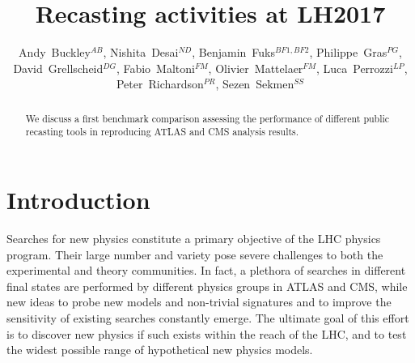 \documentclass[11pt]{cernrep}
\begin{document}
\setlength\parindent{0pt}

\title{Recasting activities at LH2017}

\author{
Andy~Buckley$^{AB}$, 
Nishita~Desai$^{ND}$,
Benjamin~Fuks$^{BF1,BF2}$,
Philippe~Gras$^{PG}$, 
David~Grellscheid$^{DG}$,
Fabio~Maltoni$^{FM}$,
Olivier~Mattelaer$^{FM}$,
Luca~Perrozzi$^{LP}$,
Peter~Richardson$^{PR}$,
Sezen~Sekmen$^{SS}$
}


\maketitle

\begin{abstract}
We discuss a first benchmark comparison assessing the performance of different public recasting tools in reproducing ATLAS and CMS analysis results.
\end{abstract}

\section{Introduction}

Searches for new physics constitute a primary objective of the LHC physics program.
Their large number and variety pose severe challenges to both the experimental and theory communities. 
In fact, a plethora of searches in different final states are performed by different physics groups in ATLAS and CMS, 
while new ideas to probe new models and non-trivial signatures and to improve the sensitivity of existing searches constantly emerge.
The ultimate goal of this effort is to discover new physics if such
exists within the reach of the LHC, and to test the widest possible range of hypothetical new physics models.
\end{document}
